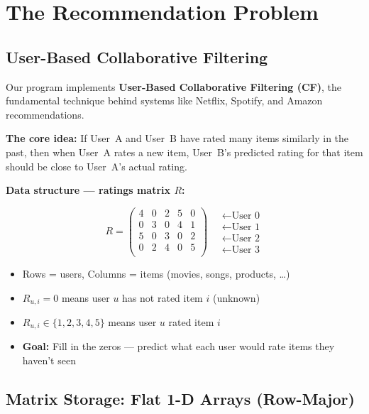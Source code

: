 \documentclass[12pt,a4paper]{article}
\begin{document}
\section{The Recommendation Problem}

\subsection{User-Based Collaborative Filtering}

Our program implements \textbf{User-Based Collaborative Filtering (CF)}, the
fundamental technique behind systems like Netflix, Spotify, and Amazon
recommendations.

\textbf{The core idea:}  If User~A and User~B have rated many items similarly
in the past, then when User~A rates a new item, User~B's predicted rating for
that item should be close to User~A's actual rating.

\medskip
\textbf{Data structure — ratings matrix $R$:}

\[
R =
\begin{pmatrix}
4 & 0 & 2 & 5 & 0 \\
0 & 3 & 0 & 4 & 1 \\
5 & 0 & 3 & 0 & 2 \\
0 & 2 & 4 & 0 & 5 \\
\end{pmatrix}
\quad
\begin{array}{l}
\leftarrow \text{User 0} \\
\leftarrow \text{User 1} \\
\leftarrow \text{User 2} \\
\leftarrow \text{User 3}
\end{array}
\]

\begin{itemize}
    \item Rows = users, Columns = items (movies, songs, products, \ldots)
    \item $R_{u,i} = 0$ means user $u$ has not rated item $i$ (unknown)
    \item $R_{u,i} \in \{1,2,3,4,5\}$ means user $u$ rated item $i$
    \item \textbf{Goal:} Fill in the zeros — predict what each user would rate items they haven't seen
\end{itemize}

\subsection{Matrix Storage: Flat 1-D Arrays (Row-Major)}
\end{document}
